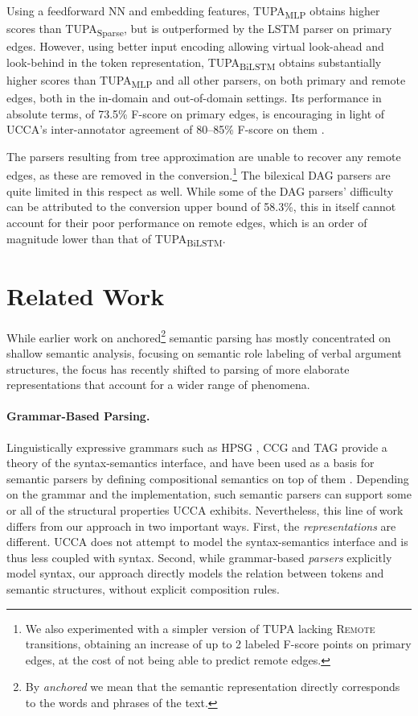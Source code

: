 \documentclass[11pt,a4paper]{article}
\newcommand{\parser}[1]{TUPA\textsubscript{#1}}
\begin{document}
Using a feedforward NN and embedding features,
\parser{MLP} obtains higher scores than \parser{Sparse},
but is outperformed by the LSTM parser on primary edges.
However, using better input encoding
allowing virtual look-ahead and look-behind in the token representation,
\parser{BiLSTM} obtains substantially higher scores than \parser{MLP}
and all other parsers, on both primary and remote edges,
both in the in-domain and out-of-domain settings.
Its performance in absolute terms, of 73.5\% F-score on primary edges,
is encouraging in light of
UCCA's inter-annotator agreement of 80--85\%
F-score on them \cite{abend2013universal}.

The parsers resulting from tree approximation are unable to recover any remote edges,
as these are removed in the conversion.\footnote{We
also experimented with a simpler version of \parser{} lacking
\textsc{Remote} transitions, obtaining an increase of up to 2 labeled F-score
points on primary edges, at the cost of not being able to predict remote edges.}
The bilexical DAG parsers are quite limited in this respect as well.
While some of the DAG parsers' difficulty can be attributed to the conversion upper bound of 58.3\%,
this in itself cannot account for their
poor performance on remote edges, which is an order of magnitude lower than that
of \parser{BiLSTM}.







\section{Related Work}\label{sec:related_work}

While earlier work on anchored\footnote{By {\it anchored} we mean that the semantic representation
directly corresponds to the words and phrases of the text.}
semantic parsing has mostly concentrated on shallow semantic analysis,
focusing on semantic role labeling of verbal argument structures,
the focus has recently shifted to parsing of more elaborate representations that account
for a wider range of phenomena.

\paragraph{Grammar-Based Parsing.}
Linguistically expressive grammars such as HPSG \cite{PandS:94}, CCG \cite{Steedman:00} and TAG \cite{Joshi:97}
provide a theory of the syntax-semantics interface, and have been used as a basis for semantic parsers
by defining compositional semantics on top of them \cite[among others]{Flic:00,bos2005towards}.
Depending on the grammar and the implementation, such semantic parsers can support
some or all of the structural properties UCCA exhibits.
Nevertheless, this line of work differs from our approach in two important ways.
First, the \textit{representations} are different. UCCA does not attempt to model
the syntax-semantics interface and is thus less coupled with syntax.
Second, while grammar-based \textit{parsers} explicitly model syntax,
our approach directly models the relation between tokens and semantic structures,
without explicit composition rules.
\end{document}
